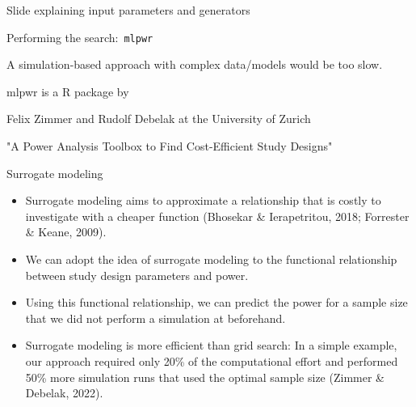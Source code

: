 \documentclass[11pt]{beamer}
\begin{document}
\begin{frame}[t]{Slide explaining input parameters and generators}

\end{frame}

\begin{frame}{Performing the search:\ \texttt{mlpwr}}

    A simulation-based approach with complex data/models would be too slow.

    mlpwr is a R package by 

    Felix Zimmer and Rudolf Debelak at the University of Zurich

     "A Power Analysis Toolbox to Find Cost-Efficient Study Designs"

\end{frame}

\begin{frame}[t]{Surrogate modeling}

    \begin{itemize}
        \item Surrogate modeling aims to approximate a relationship
            that is costly to investigate with a cheaper function
            (Bhosekar & Ierapetritou, 2018; Forrester & Keane,
            2009).

        \item  We can adopt the idea of surrogate modeling to the functional
            relationship between study design parameters and power.


        \item Using this functional relationship, we can predict the power for a
            sample size that we did not perform a simulation at beforehand.

        \item Surrogate modeling is more efficient than grid search: In a simple
            example, our approach required only 20\% of the computational effort and
            performed 50\% more simulation runs that used the optimal sample size
            (Zimmer \& Debelak, 2022).

            \end{itemize}

        \end{frame}
\end{document}
